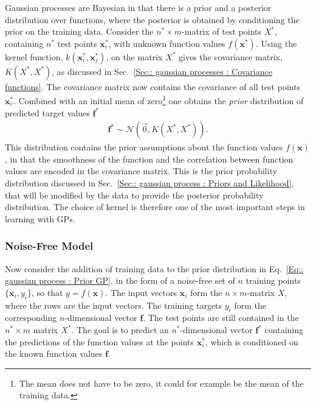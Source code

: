\documentclass[twoside,english]{uiofysmaster}
\begin{document}
{{Gaussian processes are Bayesian in that there is a prior and a posterior distribution over functions, where the posterior is obtained by conditioning the prior on the training data. Consider the $n^* \times m$-matrix of test points $X^*$, containing $n^*$ test points $\textbf{x}_i^*$, with unknown function values $f(\textbf{x}^*)$. Using the kernel function, $k(\textbf{x}_i^*, \textbf{x}_j^*)$, on the matrix $X^*$ gives the covariance matrix, $K(X^*, X^*)$, as discussed in Sec.~\ref{Sec:: gaussian processes : Covariance functions}. The covariance matrix  now contains the covariance of all test points $\textbf{x}^*_i$. Combined with an initial mean of zero\footnote{The mean does not have to be zero, it could for example be the mean of the training data.} one obtains the \textit{prior} distribution of predicted target values $\textbf{f}^*$
\begin{align}
\textbf{f}^* \sim \mathcal{N} (\vec{0}, K(X^*, X^*)).\label{Eq:: gaussian process : Prior GP}
\end{align} 
This distribution contains the prior assumptions about the function values $f(\textbf{x})$, in that the smoothness of the function and the correlation between function values are encoded in the covariance matrix. This is the prior probability distribution discussed in Sec.~\ref{Sec:: gaussian process : Priors and Likelihood}, that will be modified by the data to provide the posterior probability distribution. The choice of kernel is therefore one of the most important steps in learning with GPs. 

\subsubsection{Noise-Free Model}

Now consider the addition of training data to the prior distribution in Eq.~\ref{Eq:: gaussian process : Prior GP}, in the form of a noise-free set of $n$ training points $\{\textbf{x}_i, y_i\}$, so that $y = f(\textbf{x})$. The input vectors $\textbf{x}_i$ form the $n \times m$-matrix $X$, where the rows are the input vectors. The training targets $y_i$ form the corresponding $n$-dimensional vector $\textbf{f}$. The test points are still contained in the $n^* \times m$ matrix $X^*$. The goal is to predict an $n^*$-dimensional vector $\textbf{f}^*$ containing the predictions of the function values at the points $\textbf{x}^*_i$, which is conditioned on the known function values $\textbf{f}$. 

}}
\end{document}
